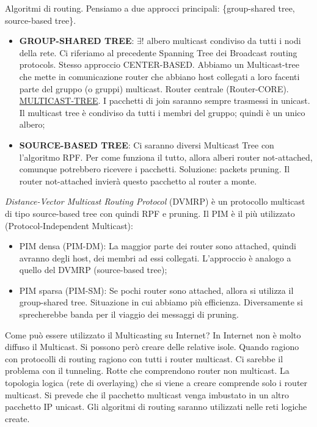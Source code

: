 Algoritmi di routing. Pensiamo a due approcci principali: \{group-shared tree, source-based tree\}.

\begin{itemize}
\item{\textbf{GROUP-SHARED TREE}}: $\exists!$ albero multicast condiviso da tutti i nodi della rete. Ci riferiamo al precedente Spanning Tree dei Broadcast routing protocols. Stesso approccio CENTER-BASED. Abbiamo un Multicast-tree che mette in comunicazione router che abbiano host collegati a loro facenti parte del gruppo (o gruppi) multicast. Router centrale (Router-CORE). \underline{MULTICAST-TREE}. I pacchetti di join saranno sempre trasmessi in unicast. Il multicast tree è condiviso da tutti i membri del gruppo; quindi è un unico albero;
\item{\textbf{SOURCE-BASED TREE}}: Ci saranno diversi Multicast Tree con l'algoritmo RPF. Per come funziona il tutto, allora alberi router not-attached, comunque potrebbero ricevere i pacchetti. Soluzione: packets pruning. Il router not-attached invierà questo pacchetto al router a monte.
\end{itemize}

\textit{Distance-Vector Multicast Routing Protocol} (DVMRP) è un protocollo multicast di tipo source-based tree con quindi RPF e pruning. Il PIM è il più utilizzato (Protocol-Independent Multicast):

\begin{itemize}
\item{PIM densa (PIM-DM)}: La maggior parte dei router sono attached, quindi avranno degli host, dei membri ad essi collegati. L'approccio è analogo a quello del DVMRP (source-based tree);
\item{PIM sparsa (PIM-SM)}: Se pochi router sono attached, allora si utilizza il group-shared tree. Situazione in cui abbiamo più efficienza. Diversamente si sprecherebbe banda per il viaggio dei messaggi di pruning.
\end{itemize}

Come può essere utilizzato il Multicasting su Internet? In Internet non è molto diffuso il Multicast. Si possono però creare delle relative isole. Quando ragiono con protocolli di routing ragiono con tutti i router multicast. Ci sarebbe il problema con il tunneling. Rotte che comprendono router non multicast. La topologia logica (rete di overlaying) che si viene a creare comprende solo i router multicast. Si prevede che il pacchetto multicast venga imbustato in un altro pacchetto IP unicast. Gli algoritmi di routing saranno utilizzati nelle reti logiche create.


